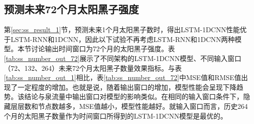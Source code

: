 \subsection{预测未来72个月太阳黑子强度}\label{sec:ss_result_72}

第\ref{sec:ss_result_1}节，预测未来1个月太阳黑子数时，得出LSTM-1DCNN性能优于LSTM-RNN和1DCNN，因此以下试验不再考虑LSTM-RNN和1DCNN两种模型。本节讨论输出时间窗口为72个月的太阳黑子强度。表\ref{tab:ss_number_out_72}展示了不同架构的LSTM-1DCNN模型、不同输入窗口（72、132、264）未来72个月太阳黑子数量效果指标。与表\ref{tab:ss_number_out_1}相比，表\ref{tab:ss_number_out_72}中MSE值和RMSE值出现了一定程度的增加。也就是说，随着输出窗口的增加，模型性能会呈现下降趋势。该结论与泉流量中输出窗口对模型的影响类似。在相同的输入窗口条件下，隐藏层层数和节点数越多，MSE值越小，模型性能越好。就输入窗口而言，历史264个月的太阳黑子数量作为时间窗口所得到的LSTM-1DCNN模型是最优的。

